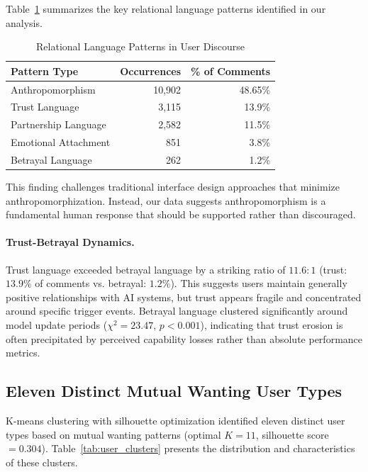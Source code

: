 \documentclass{article}
\begin{document}
Table~\ref{tab:relational_patterns} summarizes the key relational language patterns identified in our analysis.

\begin{table}[htbp]
\centering
\caption{Relational Language Patterns in User Discourse}
\label{tab:relational_patterns}
\begin{tabular}{@{}lrr@{}}
\toprule
Pattern Type & Occurrences & \% of Comments \\
\midrule
Anthropomorphism & 10,902 & 48.65\% \\
Trust Language & 3,115 & 13.9\% \\
Partnership Language & 2,582 & 11.5\% \\
Emotional Attachment & 851 & 3.8\% \\
Betrayal Language & 262 & 1.2\% \\
\bottomrule
\end{tabular}
\end{table}

This finding challenges traditional interface design approaches that minimize anthropomorphization. Instead, our data suggests anthropomorphism is a fundamental human response that should be supported rather than discouraged.

\paragraph{Trust-Betrayal Dynamics.}
Trust language exceeded betrayal language by a striking ratio of $11.6:1$ (trust: $13.9\%$ of comments vs. betrayal: $1.2\%$). This suggests users maintain generally positive relationships with AI systems, but trust appears fragile and concentrated around specific trigger events. Betrayal language clustered significantly around model update periods ($\chi^2=23.47$, $p<0.001$), indicating that trust erosion is often precipitated by perceived capability losses rather than absolute performance metrics.

\subsection{Eleven Distinct Mutual Wanting User Types}

K-means clustering with silhouette optimization identified eleven distinct user types based on mutual wanting patterns (optimal $K=11$, silhouette score $=0.304$). Table~\ref{tab:user_clusters} presents the distribution and characteristics of these clusters.
\end{document}
